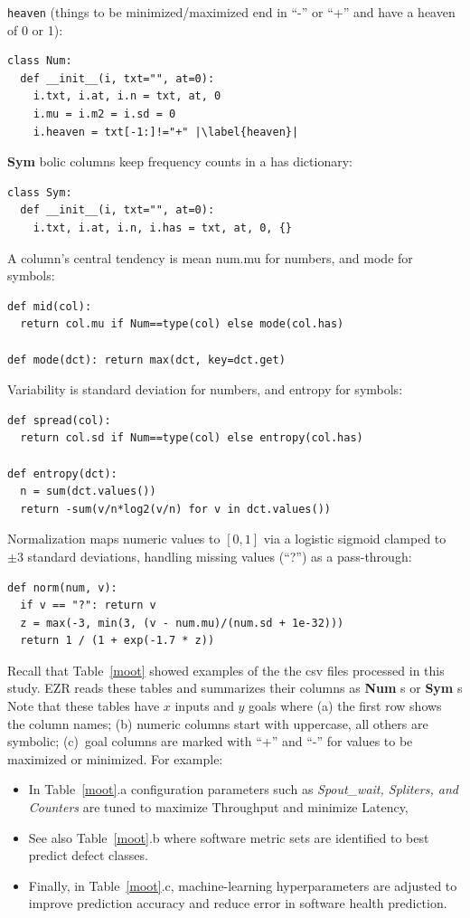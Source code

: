 \documentclass[AMA,STIX2COL]{WileyNJDv5}
\newcommand{\cls}[1]{%
  \setlength{\fboxsep}{1.5pt}%
  \colorbox{clsbg}{\sffamily\bfseries{#1}}%
}
\begin{document}
\texttt{heaven} (things to be minimized/maximized end in ``-'' or ``+'' 
and have a \textsf{heaven}   of 0 or 1):
\begin{verbatim}
class Num:
  def __init__(i, txt="", at=0):
    i.txt, i.at, i.n = txt, at, 0
    i.mu = i.m2 = i.sd = 0
    i.heaven = txt[-1:]!="+" |\label{heaven}|
\end{verbatim}
\cls{Sym}bolic columns   keep   frequency counts in a \textsf{has} dictionary:
\begin{verbatim}
class Sym:
  def __init__(i, txt="", at=0):
    i.txt, i.at, i.n, i.has = txt, at, 0, {}
\end{verbatim}
A column's central tendency is mean \textsf{num.mu} for numbers, and mode for symbols:
\begin{verbatim}
def mid(col):
  return col.mu if Num==type(col) else mode(col.has)

def mode(dct): return max(dct, key=dct.get)
\end{verbatim}
Variability is standard deviation for numbers, and entropy for symbols:
\begin{verbatim}
def spread(col):
  return col.sd if Num==type(col) else entropy(col.has)

def entropy(dct): 
  n = sum(dct.values())
  return -sum(v/n*log2(v/n) for v in dct.values())
\end{verbatim}
Normalization maps numeric values to $[0,1]$ via a logistic sigmoid clamped 
to $\pm3$ standard deviations, handling missing values (``?'') as a pass-through:
\begin{verbatim}
def norm(num, v):
  if v == "?": return v
  z = max(-3, min(3, (v - num.mu)/(num.sd + 1e-32)))
  return 1 / (1 + exp(-1.7 * z))
\end{verbatim}
Recall that Table~\ref{moot}
showed examples of the    the csv files processed in this study. EZR
reads these tables and summarizes their columns as \cls{Num}s or \cls{Sym}s
Note that these tables have $x$ inputs and $y$ goals where
(a) the first row shows the column names;
(b) numeric columns start with uppercase, all others are symbolic;
(c)~goal columns are marked with ``+'' and ``-'' for values to be maximized or minimized.
For example:
\begin{itemize}
\item
In  Table~\ref{moot}.a configuration parameters such as {\em Spout\_wait, Spliters, and Counters} are tuned to maximize Throughput and minimize Latency,
\item
See also  Table~\ref{moot}.b where software metric sets are identified to best predict defect classes.
\item
Finally, in Table~\ref{moot}.c, machine-learning hyperparameters are adjusted to improve prediction accuracy and reduce error in software health prediction.  
\end{itemize}
\end{document}
